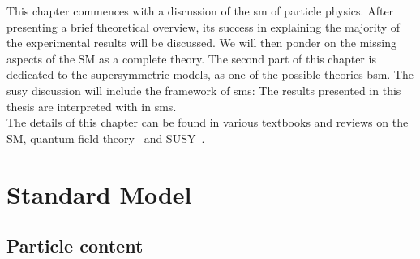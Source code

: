 This chapter commences with a discussion of the \acrshort{sm} of particle physics. After presenting a brief theoretical overview, its success in explaining the majority of the experimental results will be discussed. We will then ponder on the missing aspects of the SM as a complete theory. The second part of this chapter is dedicated to the supersymmetric models, as one of the possible theories \acrfull{bsm}. The \acrfull{susy} discussion will include the framework of \acrfull{sms}: The results presented in this thesis are interpreted with in \acrshort{sms}.\\
The details of this chapter can be found in various textbooks and reviews on the SM, quantum field theory~\cite{SM1,SM2,SM3,nickef,srednicki} and SUSY~\cite{SUSY1}.
\section{Standard Model}
\label{sec:StandardModel}
\subsection{Particle content}
\label{sec:StandardModelParticleContent}


